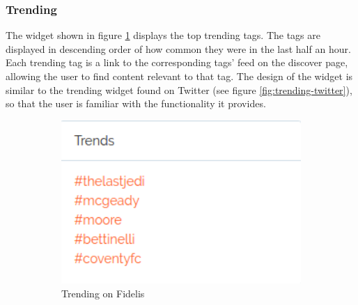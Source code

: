 \subsubsection{Trending} \label{sec:design-trending}
The widget shown in figure \ref{fig:trending} displays the top trending tags. The tags are displayed in descending order of how common they were in the last half an hour. Each trending tag is a link to the corresponding tags' feed on the discover page, allowing the user to find content relevant to that tag. The design of the widget is similar to the trending widget found on Twitter (see figure \ref{fig:trending-twitter}), so that the user is familiar with the functionality it provides.

\begin{figure}[H]
    \centering
    \begin{subfigure}[b]{0.4\linewidth}
        \includegraphics[width=1\textwidth]{Images/Design/trending-widget}
        \caption{Trending on Fidelis}
        \label{fig:trending}
    \end{subfigure}
    \begin{subfigure}[b]{0.4\linewidth}

\end{subfigure}
\end{figure}
